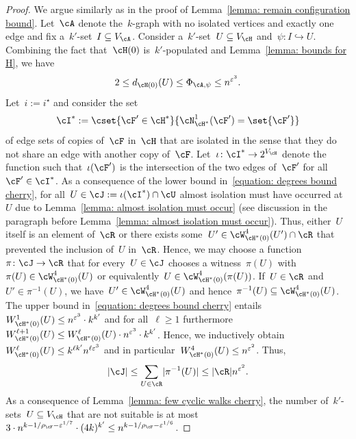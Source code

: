 \documentclass[11pt]{amsart}
\newcommand{\eps}{\varepsilon}
\DeclarePairedDelimiter{\abs}{\lvert}{\rvert}
\newcommand{\injection}{\hookrightarrow}
\theoremstyle{definition}
\numberwithin{equation}{section}
\begin{document}
	\begin{proof}
		We argue similarly as in the proof of Lemma~\ref{lemma: remain configuration bound}.
		Let~$\cA$ denote the~$k$-graph with no isolated vertices and exactly one edge and fix a~$k'$-set~$I\subseteq V_\cA$.
		Consider a~$k'$-set~$U\subseteq V_\cH$ and~$\psi\colon I\injection U$.
		Combining the fact that~$\cH(0)$ is~$k'$-populated and Lemma~\ref{lemma: bounds for H}, we have
		\begin{equation}\label{equation: degrees bound cherry}
			2\leq d_{\cH(0)}(U)\leq \Phi_{\cA,\psi}\leq n^{\eps^3}.
		\end{equation}
		Let~$i:=i^\star$ and consider the set
		\begin{equation*}
			\cI^*:=\cset{ \cF'\in\cH^* }{ \cN_{\cH^*}^1(\cF')=\set{\cF'} }
		\end{equation*}
		of edge sets of copies of~$\cF$ in~$\cH$ that are isolated in the sense that they do not share an edge with another copy of~$\cF$.
		Let~$\iota\colon\cI^*\to 2^{V_\cH}$ denote the function such that~$\iota(\cF')$ is the intersection of the two edges of~$\cF'$ for all~$\cF'\in\cI^*$.
		As a consequence of the lower bound in~\eqref{equation: degrees bound cherry}, for all~$U\in \cJ:=\iota(\cI^*)\cap \cU$ almost isolation must have occurred at~$U$ due to Lemma~\ref{lemma: almost isolation must occur} (see discussion in the paragraph before Lemma~\ref{lemma: almost isolation must occur}).
		Thus, either~$U$ itself is an element of~$\cR$ or there exists some~$U'\in\cW_{\cH^*(0)}^4(U')\cap \cR$ that prevented the inclusion of~$U$ in~$\cR$.
		Hence, we may choose a function~$\pi\colon\cJ\to \cR$ that for every~$U\in\cJ$ chooses a witness~$\pi(U)$ with~$\pi(U)\in\cW_{\cH^*(0)}^4(U)$ or equivalently~$U\in\cW_{\cH^*(0)}^4(\pi(U))$.
		If~$U\in\cR$ and~$U'\in\pi^{-1}(U)$, we have~$U'\in\cW_{\cH^*(0)}^4(U)$ and hence~$\pi^{-1}(U)\subseteq \cW_{\cH^*(0)}^4(U)$.
		The upper bound in~\eqref{equation: degrees bound cherry} entails~$W_{\cH^*(0)}^{1}(U)\leq n^{\eps^{3}}\cdot k^{k'}$ and for all~$\ell\geq 1$ furthermore~$W_{\cH^*(0)}^{\ell+1}(U)\leq W_{\cH^*(0)}^{\ell}(U)\cdot n^{\eps^{3}}\cdot k^{k'}$.
		Hence, we inductively obtain~$W_{\cH^*(0)}^\ell(U)\leq k^{\ell k'} n^{\ell \eps^{3}}$ and in particular~$W_{\cH^*(0)}^4(U)\leq n^{\eps^{2}}$.
		Thus,
		\begin{equation*}
			\abs{\cJ}\leq \sum_{U\in\cR}\abs{\pi^{-1}(U)}\leq \abs{\cR}n^{\eps^{2}}.
		\end{equation*}
		As a consequence of Lemma~\ref{lemma: few cyclic walks cherry}, the number of~$k'$-sets~$U\subseteq V_\cH$ that are not suitable is at most~$3\cdot n^{k-1/\rho_\cF-\eps^{1/7}}\cdot (4k)^{k'}\leq n^{k-1/\rho_\cF-\eps^{1/6}}$.

\end{proof}
\end{document}
